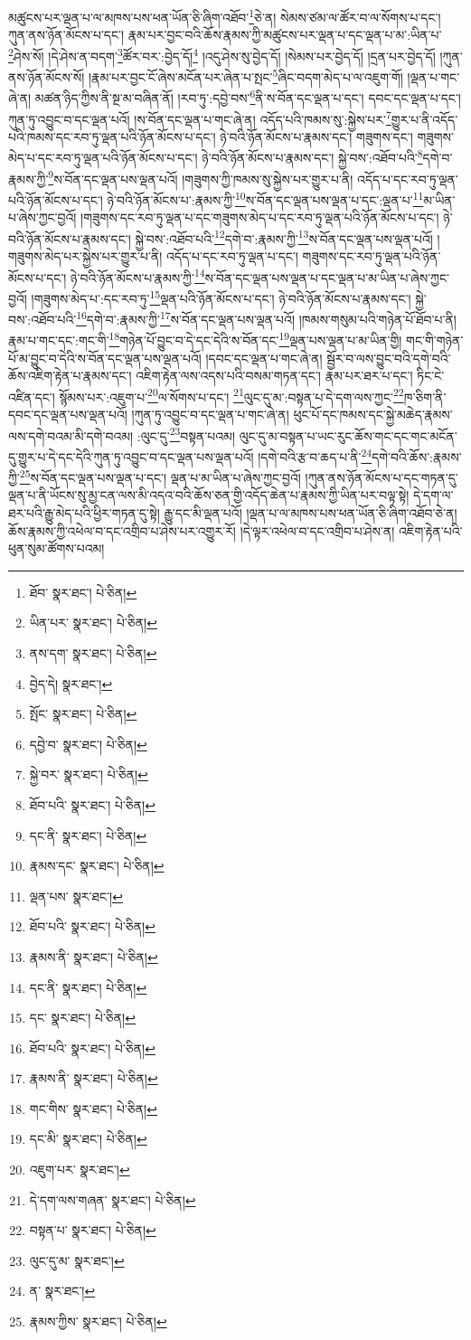 མཚུངས་པར་ལྡན་པ་ལ་མཁས་པས་ཕན་ཡོན་ཅི་ཞིག་འཐོབ་\footnote{ཐོབ་  སྣར་ཐང་།  པེ་ཅིན། }ཅེ་ན། སེམས་ཙམ་ལ་ཚོར་བ་ལ་སོགས་པ་དང་། ཀུན་ནས་ཉོན་མོངས་པ་དང་། རྣམ་པར་བྱང་བའི་ཆོས་རྣམས་ཀྱི་མཚུངས་པར་ལྡན་པ་དང་ལྡན་པ་མ་:ཡིན་པ་\footnote{ཡིན་པར་  སྣར་ཐང་།  པེ་ཅིན། }ཤེས་སོ། །དེ་ཤེས་ན་བདག་\footnote{ནས་དག་  སྣར་ཐང་།  པེ་ཅིན། }ཚོར་བར་:བྱེད་དོ།\footnote{བྱེད་དེ།  སྣར་ཐང་། } །འདུ་ཤེས་སུ་བྱེད་དོ། །སེམས་པར་བྱེད་དོ། །དྲན་པར་བྱེད་དོ། །ཀུན་ནས་ཉོན་མོངས་སོ། །རྣམ་པར་བྱང་ངོ་ཞེས་མངོན་པར་ཞེན་པ་སྤང་\footnote{སྤོང་  སྣར་ཐང་།  པེ་ཅིན། }ཞིང་བདག་མེད་པ་ལ་འཇུག་གོ། །ལྡན་པ་གང་ཞེ་ན། མཚན་ཉིད་ཀྱིས་ནི་སྔ་མ་བཞིན་ནོ། །རབ་ཏུ་:དབྱེ་བས་\footnote{དབྱེ་བ་  སྣར་ཐང་།  པེ་ཅིན། }ནི་ས་བོན་དང་ལྡན་པ་དང་། དབང་དང་ལྡན་པ་དང་། ཀུན་ཏུ་འབྱུང་བ་དང་ལྡན་པའོ། །ས་བོན་དང་ལྡན་པ་གང་ཞེ་ན། འདོད་པའི་ཁམས་སུ་:སྐྱེས་པར་\footnote{སྐྱེ་བར་  སྣར་ཐང་།  པེ་ཅིན། }གྱུར་པ་ནི་འདོད་པའི་ཁམས་དང་རབ་ཏུ་ལྡན་པའི་ཉོན་མོངས་པ་དང་། ཉེ་བའི་ཉོན་མོངས་པ་རྣམས་དང་། གཟུགས་དང་། གཟུགས་མེད་པ་དང་རབ་ཏུ་ལྡན་པའི་ཉོན་མོངས་པ་དང་། ཉེ་བའི་ཉོན་མོངས་པ་རྣམས་དང་། སྐྱེ་བས་:འཐོབ་པའི་\footnote{ཐོབ་པའི་  སྣར་ཐང་།  པེ་ཅིན། }དགེ་བ་རྣམས་ཀྱི་\footnote{དང་ནི་  སྣར་ཐང་།  པེ་ཅིན། }ས་བོན་དང་ལྡན་པས་ལྡན་པའོ། །གཟུགས་ཀྱི་ཁམས་སུ་སྐྱེས་པར་གྱུར་པ་ནི། འདོད་པ་དང་རབ་ཏུ་ལྡན་པའི་ཉོན་མོངས་པ་དང་། ཉེ་བའི་ཉོན་མོངས་པ་:རྣམས་ཀྱི་\footnote{རྣམས་དང་  སྣར་ཐང་།  པེ་ཅིན། }ས་བོན་དང་ལྡན་པས་ལྡན་པ་དང་:ལྡན་པ་\footnote{ལྡན་པས་  སྣར་ཐང་། }མ་ཡིན་པ་ཞེས་ཀྱང་བྱའོ། །གཟུགས་དང་རབ་ཏུ་ལྡན་པ་དང་གཟུགས་མེད་པ་དང་རབ་ཏུ་ལྡན་པའི་ཉོན་མོངས་པ་དང་། ཉེ་བའི་ཉོན་མོངས་པ་རྣམས་དང་། སྐྱེ་བས་:འཐོབ་པའི་\footnote{ཐོབ་པའི་  སྣར་ཐང་།  པེ་ཅིན། }དགེ་བ་:རྣམས་ཀྱི་\footnote{རྣམས་ནི་  སྣར་ཐང་།  པེ་ཅིན། }ས་བོན་དང་ལྡན་པས་ལྡན་པའོ། །གཟུགས་མེད་པར་སྐྱེས་པར་གྱུར་པ་ནི། འདོད་པ་དང་རབ་ཏུ་ལྡན་པ་དང་། གཟུགས་དང་རབ་ཏུ་ལྡན་པའི་ཉོན་མོངས་པ་དང་། ཉེ་བའི་ཉོན་མོངས་པ་རྣམས་ཀྱི་\footnote{དང་ནི་  སྣར་ཐང་།  པེ་ཅིན། }ས་བོན་དང་ལྡན་པས་ལྡན་པ་དང་ལྡན་པ་མ་ཡིན་པ་ཞེས་ཀྱང་བྱའོ། །གཟུགས་མེད་པ་:དང་རབ་ཏུ་\footnote{དང་  སྣར་ཐང་།  པེ་ཅིན། }ལྡན་པའི་ཉོན་མོངས་པ་དང་། ཉེ་བའི་ཉོན་མོངས་པ་རྣམས་དང་། སྐྱེ་བས་:འཐོབ་པའི་\footnote{ཐོབ་པའི་  སྣར་ཐང་།  པེ་ཅིན། }དགེ་བ་:རྣམས་ཀྱི་\footnote{རྣམས་ནི་  སྣར་ཐང་།  པེ་ཅིན། }ས་བོན་དང་ལྡན་པས་ལྡན་པའོ། །ཁམས་གསུམ་པའི་གཉེན་པོ་ཐོབ་པ་ནི། རྣམ་པ་གང་དང་:གང་གི་\footnote{གང་གིས་  སྣར་ཐང་།  པེ་ཅིན། }གཉེན་པོ་བྱུང་བ་དེ་དང་དེའི་ས་བོན་དང་\footnote{དང་མི་  སྣར་ཐང་།  པེ་ཅིན། }ལྡན་པས་ལྡན་པ་མ་ཡིན་གྱི། གང་གི་གཉེན་པོ་མ་བྱུང་བ་དེའི་ས་བོན་དང་ལྡན་པས་ལྡན་པའོ། །དབང་དང་ལྡན་པ་གང་ཞེ་ན། སྦྱོར་བ་ལས་བྱུང་བའི་དགེ་བའི་ཆོས་འཇིག་རྟེན་པ་རྣམས་དང་། འཇིག་རྟེན་ལས་འདས་པའི་བསམ་གཏན་དང་། རྣམ་པར་ཐར་པ་དང་། ཏིང་ངེ་འཛིན་དང་། སྙོམས་པར་:འཇུག་པ་\footnote{འཇུག་པར་  སྣར་ཐང་། }ལ་སོགས་པ་དང་། \footnote{དེ་དག་ལས་གཞན་  སྣར་ཐང་།  པེ་ཅིན། }ལུང་དུ་མ་:བསྟན་པ་དེ་དག་ལས་ཀྱང་\footnote{བསྟན་པ་  སྣར་ཐང་།  པེ་ཅིན། }ཁ་ཅིག་ནི་དབང་དང་ལྡན་པས་ལྡན་པའོ། །ཀུན་ཏུ་འབྱུང་བ་དང་ལྡན་པ་གང་ཞེ་ན། ཕུང་པོ་དང་ཁམས་དང་སྐྱེ་མཆེད་རྣམས་ལས་དགེ་བའམ་མི་དགེ་བའམ། :ལུང་དུ་\footnote{ལུང་དུ་མ་  སྣར་ཐང་། }བསྟན་པའམ། ལུང་དུ་མ་བསྟན་པ་ཡང་རུང་ཆོས་གང་དང་གང་མངོན་དུ་གྱུར་པ་དེ་དང་དེའི་ཀུན་ཏུ་འབྱུང་བ་དང་ལྡན་པས་ལྡན་པའོ། །དགེ་བའི་རྩ་བ་ཆད་པ་ནི་\footnote{ན་  སྣར་ཐང་། }དགེ་བའི་ཆོས་:རྣམས་ཀྱི་\footnote{རྣམས་ཀྱིས་  སྣར་ཐང་།  པེ་ཅིན། }ས་བོན་དང་ལྡན་པས་ལྡན་པ་དང་། ལྡན་པ་མ་ཡིན་པ་ཞེས་ཀྱང་བྱའོ། །ཀུན་ནས་ཉོན་མོངས་པ་དང་གཏན་དུ་ལྡན་པ་ནི་ཡོངས་སུ་མྱ་ངན་ལས་མི་འདའ་བའི་ཆོས་ཅན་གྱི་འདོད་ཆེན་པ་རྣམས་ཀྱི་ཡིན་པར་བལྟ་སྟེ། དེ་དག་ལ་ཐར་པའི་རྒྱུ་མེད་པའི་ཕྱིར་གཏན་དུ་སྟེ། རྒྱུ་དང་མི་ལྡན་པའོ། །ལྡན་པ་ལ་མཁས་པས་ཕན་ཡོན་ཅི་ཞིག་འཐོབ་ཅེ་ན། ཆོས་རྣམས་ཀྱི་འཕེལ་བ་དང་འགྲིབ་པ་ཤེས་པར་འགྱུར་རོ། །དེ་ལྟར་འཕེལ་བ་དང་འགྲིབ་པ་ཤེས་ན། འཇིག་རྟེན་པའི་ཕུན་སུམ་ཚོགས་པའམ། 